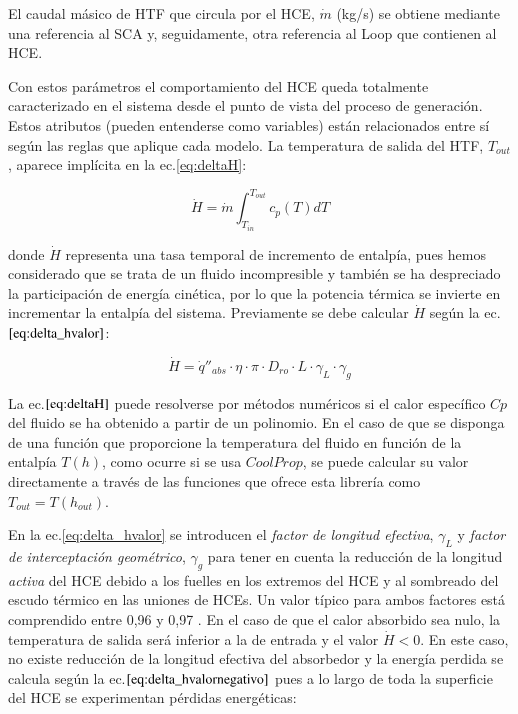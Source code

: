 El caudal másico de HTF que circula por el HCE, $ \dot m $ (kg/s) se obtiene mediante una referencia al SCA y, seguidamente, otra referencia al Loop que contienen al HCE. 

Con estos parámetros el comportamiento del HCE queda totalmente caracterizado en el sistema desde el punto de vista del proceso de generación. Estos atributos (pueden entenderse como variables) están relacionados entre sí según las reglas que aplique cada modelo. La temperatura de salida del HTF, $T_{out}$, aparece implícita en la ec.\ref{eq:deltaH}:

\begin{equation}
    \dot H =  \dot m  \int^{T_{out}}_{T_{in}}c_p(T) dT 
    \label{eq:deltaH}
\end{equation}

donde \(\dot H\) representa una tasa temporal de incremento de entalpía, pues hemos considerado que se trata de un fluido incompresible y también se ha despreciado la participación de energía cinética, por lo que la potencia térmica se invierte en incrementar la entalpía del sistema. Previamente se debe calcular \(\dot H\) según la ec.\(\eqref{eq:delta_hvalor}\):

\begin{equation}
   \dot H =  \dot q''_{abs} \cdot \eta \cdot \pi \cdot D_{ro} \cdot L \cdot \gamma_L \cdot \gamma_g
    \label{eq:delta_hvalor}
\end{equation}

La ec.\(\eqref{eq:deltaH}\) puede resolverse por métodos numéricos si el calor específico \(Cp\) del fluido se ha obtenido a partir de un polinomio. En el caso de que se disponga de una función que proporcione la temperatura del fluido en función de la entalpía \(T(h)\), como ocurre si se usa \(CoolProp\), se puede calcular su valor directamente a través de las funciones que ofrece esta librería como \(T_{out} = T(h_{out})\).

En la ec.\ref{eq:delta_hvalor} se introducen el \textit{factor de longitud efectiva}, \(\gamma_L\) y \textit{factor de interceptación geométrico}, \(\gamma_g\) para tener en cuenta la reducción de la longitud \textit{activa} del HCE debido a los fuelles en los extremos del HCE y al sombreado del escudo térmico en las uniones de HCEs. Un valor típico para ambos factores está comprendido entre 0,96 y 0,97 \cite{zarzaApuntesMasterConsultor2006}. En el caso de que el calor absorbido sea nulo, la temperatura de salida será inferior a la de entrada y el valor \(\dot H < 0\). En este caso, no existe reducción de la longitud efectiva del absorbedor y la energía perdida se calcula según la ec.\(\eqref{eq:delta_hvalornegativo}\) pues a lo largo de toda la superficie del HCE se experimentan pérdidas energéticas:


